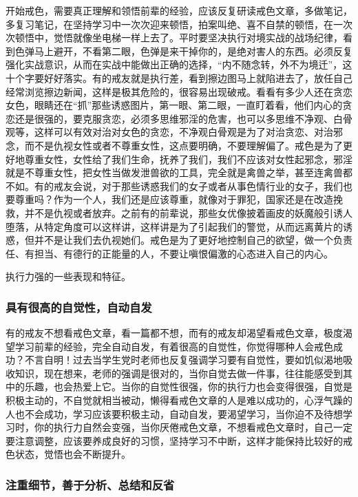 开始戒色，需要真正理解和领悟前辈的经验，应该反复研读戒色文章，多做笔记，多复习笔记，在坚持学习中一次次迎来顿悟，拍案叫绝、喜不自禁的顿悟，在一次次顿悟中，觉悟就像坐电梯一样上去了。平时要坚决执行对境实战的战场纪律，看到色弹马上避开，不看第二眼，色弹是来干掉你的，是绝对害人的东西。必须反复强化实战意识，从而在实战中能做出正确的选择，“内不随念转，外不为境迁”，这十个字要好好落实。有的戒友就是执行差，看到擦边图马上就陷进去了，放任自己经常浏览擦边新闻，这样是极其危险的，很容易出现破戒。看看有多少人还在贪恋女色，眼睛还在“抓”那些诱惑图片，第一眼、第二眼，一直盯着看，他们内心的贪恋还是很强的，要克服贪恋，必须多思维邪淫的危害，也可以多思维不净观、白骨观等，这样可以有效对治对女色的贪恋，不净观白骨观是为了对治贪恋、对治邪念，而不是仇视女性或者不尊重女性，这点要明确，不要理解偏了。戒色是为了更好地尊重女性，女性给了我们生命，抚养了我们，我们不应该对女性起邪念，邪淫就是不尊重女性，把女性当做发泄兽欲的工具，完全就是禽兽之举，甚至连禽兽都不如。有的戒友会说，对于那些诱惑我们的女子或者从事色情行业的女子，我们也要尊重吗？作为一个人，我们还是应该尊重，就像对于罪犯，国家还是在改造挽救，并不是仇视或者放弃。之前有的前辈说，那些女优像披着画皮的妖魔般引诱人堕落，从特定角度可以这样讲，这样讲是为了引起我们的警觉，从而远离黄片的诱惑，但并不是让我们去仇视她们。戒色是为了更好地控制自己的欲望，做一个负责任、有担当、有德行的正能量的人，不要让嗔恨偏激的心态进入自己的内心。

执行力强的一些表现和特征。

\subsubsection{具有很高的自觉性，自动自发}

有的戒友不想看戒色文章，看一篇都不想，而有的戒友却渴望看戒色文章，极度渴望学习前辈的经验，完全自动自发，有着很高的自觉性，你觉得哪种人会戒色成功？不言自明！过去当学生党时老师也反复强调学习要有自觉性，要如饥似渴地吸收知识，现在想来，老师的强调是很对的，当你自觉去做一件事，往往能感受到其中的乐趣，也会热爱上它。当你的自觉性很强，你的执行力也会变得很强，自觉是积极主动的，不自觉就相当被动，懒得看戒色文章的人是难以成功的，心浮气躁的人也不会成功，学习应该要积极主动，自动自发，要渴望学习，当你迫不及待想学习时，你的执行力自然会变强，当你厌倦戒色文章，不想看戒色文章时，自己一定要注意调整，应该要养成良好的习惯，坚持学习不中断，这样才能保持比较好的戒色状态，觉悟也会不断提升。

\subsubsection{注重细节，善于分析、总结和反省}


